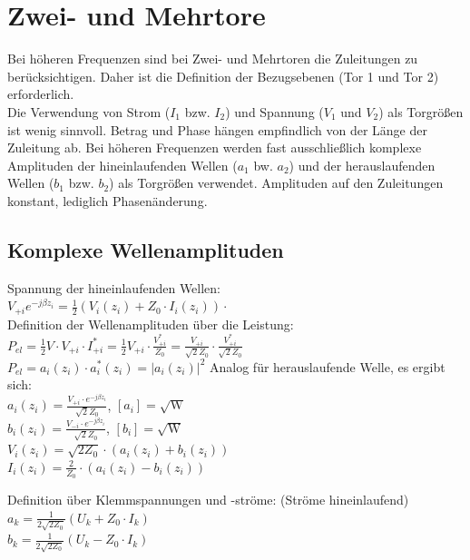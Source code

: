 \documentclass[english]{latex4ei/latex4ei_sheet}
\begin{document}
\section{Zwei- und Mehrtore}
\begin{sectionbox}
    Bei höheren Frequenzen sind bei Zwei- und Mehrtoren die Zuleitungen zu berücksichtigen. Daher ist die Definition der Bezugsebenen (Tor 1 und Tor 2) erforderlich.\\
    Die Verwendung von Strom ($I_1$ bzw. $I_2$) und Spannung ($V_1$ und $V_2$) als Torgrößen ist wenig sinnvoll. Betrag und Phase hängen empfindlich von der Länge der Zuleitung ab.
    Bei höheren Frequenzen werden fast ausschließlich komplexe Amplituden der hineinlaufenden Wellen ($a_1$ bw. $a_2$) und der herauslaufenden Wellen ($b_1$ bzw. $b_2$) als Torgrößen verwendet. Amplituden auf den Zuleitungen konstant, lediglich Phasenänderung.
\end{sectionbox}
\begin{sectionbox}
    \subsection{Komplexe Wellenamplituden}
    Spannung der hineinlaufenden Wellen:\\
    $V_{+i}e^{-j\beta z_i} = \frac{1}{2}(V_i(z_i) + Z_0 \cdot I_i(z_i))\cdot $\\
    Definition der Wellenamplituden über die Leistung:\\
    $P_{el} = \frac{1}{2}V\cdot V_{+i} \cdot I_{+i}^* = \frac{1}{2}V_{+i}\cdot \frac{V_{+i}^*}{Z_0} = \frac{V_{+i}}{\sqrt{2} Z_0}\cdot\frac{V_{+i}^*}{\sqrt{2} Z_0}$\\

    $P_{el} = a_i(z_i)\cdot a_i^*(z_i) = |a_i(z_i)|^2$
    Analog für herauslaufende Welle, es ergibt sich:\\
    $a_i(z_i) = \frac{V_{+i}\cdot e^{-j\beta z_i}}{\sqrt{2}Z_0}$, \qquad $[a_i] = \sqrt{\text{W}}$\\

    $b_i(z_i) = \frac{V_{-i}\cdot e^{-j\beta z_i}}{\sqrt{2}Z_0}$, \qquad $[b_i] = \sqrt{\text{W}}$\\

    $V_i(z_i) = \sqrt{2Z_0} \cdot (a_i(z_i) + b_i(z_i))$\\
    $I_i(z_i) = \frac{2}{Z_0} \cdot (a_i(z_i) - b_i(z_i))$

    Definition über Klemmspannungen und -ströme: (Ströme hineinlaufend)\\
    $a_{k}=\frac{1}{2 \sqrt{2 Z_{0}}}\left(U_{k}+Z_{0} \cdot I_{k}\right)$\\
    $b_{k}=\frac{1}{2 \sqrt{2 Z_{0}}}\left(U_{k}-Z_{0} \cdot I_{k}\right)$
\end{sectionbox}
\end{document}
